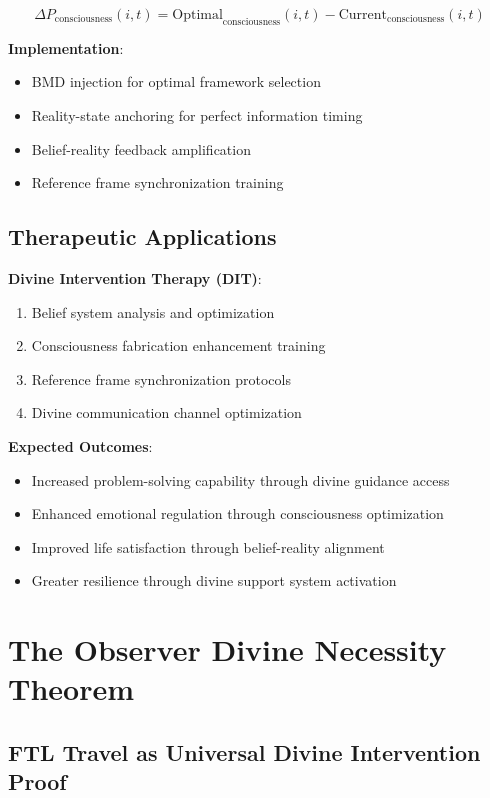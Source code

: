 \documentclass[12pt,a4paper]{article}
\begin{document}
$$\Delta P_{\text{consciousness}}(i,t) = \text{Optimal}_{\text{consciousness}}(i,t) - \text{Current}_{\text{consciousness}}(i,t)$$

\textbf{Implementation}:
\begin{itemize}
\item BMD injection for optimal framework selection
\item Reality-state anchoring for perfect information timing
\item Belief-reality feedback amplification
\item Reference frame synchronization training
\end{itemize}

\subsection{Therapeutic Applications}

\textbf{Divine Intervention Therapy (DIT)}:
\begin{enumerate}
\item Belief system analysis and optimization
\item Consciousness fabrication enhancement training
\item Reference frame synchronization protocols
\item Divine communication channel optimization
\end{enumerate}

\textbf{Expected Outcomes}:
\begin{itemize}
\item Increased problem-solving capability through divine guidance access
\item Enhanced emotional regulation through consciousness optimization
\item Improved life satisfaction through belief-reality alignment
\item Greater resilience through divine support system activation
\end{itemize}

\section{The Observer Divine Necessity Theorem}

\subsection{FTL Travel as Universal Divine Intervention Proof}
\end{document}
